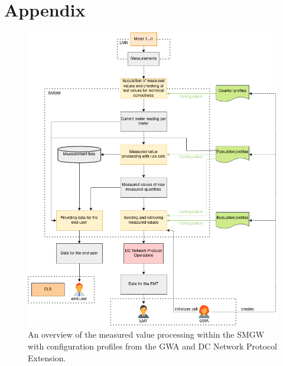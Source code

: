 \chapter*{Appendix}
\label{sec:Appendix}

\begin{figure}[H]
  \centering
  \includegraphics[width=1\textwidth]{images/Messverarbeitung_mit_DC_Eng.png}
  \caption[Measured Value Processing in a SMGW]{An overview of the measured value processing within the SMGW with configuration profiles from the GWA and DC Network Protocol Extension.}
  \label{fig:value_processing_with_dc}
\end{figure}

